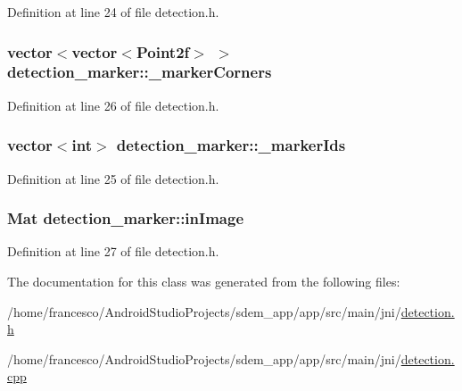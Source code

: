 Definition at line 24 of file detection.\+h.

\hypertarget{classdetection__marker_a32435b120f01d7a7ed4d0e6e926aa5c9}{
\subsubsection[{\+\_\+marker\+Corners}]{\setlength{\rightskip}{0pt plus 5cm}vector$<$vector$<$Point2f$>$ $>$ detection\+\_\+marker\+::\+\_\+marker\+Corners\hspace{0.3cm}{\ttfamily [private]}}}\label{classdetection__marker_a32435b120f01d7a7ed4d0e6e926aa5c9}


Definition at line 26 of file detection.\+h.

\hypertarget{classdetection__marker_ae0518eaa5762d3cf2d6570cb3440bd91}{
\subsubsection[{\+\_\+marker\+Ids}]{\setlength{\rightskip}{0pt plus 5cm}vector$<$int$>$ detection\+\_\+marker\+::\+\_\+marker\+Ids\hspace{0.3cm}{\ttfamily [private]}}}\label{classdetection__marker_ae0518eaa5762d3cf2d6570cb3440bd91}


Definition at line 25 of file detection.\+h.

\hypertarget{classdetection__marker_a38b3944516f9a3ae26d23ed9a8b5ce52}{
\subsubsection[{in\+Image}]{\setlength{\rightskip}{0pt plus 5cm}Mat detection\+\_\+marker\+::in\+Image\hspace{0.3cm}{\ttfamily [private]}}}\label{classdetection__marker_a38b3944516f9a3ae26d23ed9a8b5ce52}


Definition at line 27 of file detection.\+h.



The documentation for this class was generated from the following files\+:\begin{DoxyCompactItemize}
\item 
/home/francesco/\+Android\+Studio\+Projects/sdem\+\_\+app/app/src/main/jni/\hyperlink{detection_8h}{detection.\+h}\item 
/home/francesco/\+Android\+Studio\+Projects/sdem\+\_\+app/app/src/main/jni/\hyperlink{detection_8cpp}{detection.\+cpp}\end{DoxyCompactItemize}
